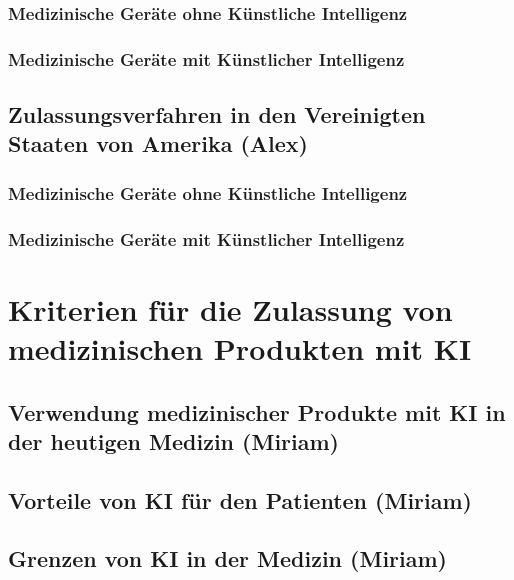 \documentclass[a4paper, 11pt]{article}
\begin{document}
			\subsubsection{Medizinische Geräte ohne Künstliche Intelligenz}\label{sec:europe-no-ai}
				
			\subsubsection{Medizinische Geräte mit Künstlicher Intelligenz}\label{sec:europe-with-ai}
				
		\subsection{Zulassungsverfahren in den Vereinigten Staaten von Amerika \small{(Alex)}}\label{sec:us}
			
			\subsubsection{Medizinische Geräte ohne Künstliche Intelligenz}\label{sec:us-no-ai}
				
			\subsubsection{Medizinische Geräte mit Künstlicher Intelligenz}\label{sec:us-with-ai}
				

	\newpage
	\section{Kriterien für die Zulassung von medizinischen Produkten mit KI}\label{sec:analysis}
				
			\subsection{Verwendung medizinischer Produkte mit KI in der heutigen Medizin \small{(Miriam)}}\label{sec:ki-today}
				
			\subsection{Vorteile von KI für den Patienten \small{(Miriam)}}\label{sec:ki-advantages}
				
			\subsection{Grenzen von KI in der Medizin  \small{(Miriam)}}\label{sec:ki-limitations}
				
	\newpage
\end{document}
